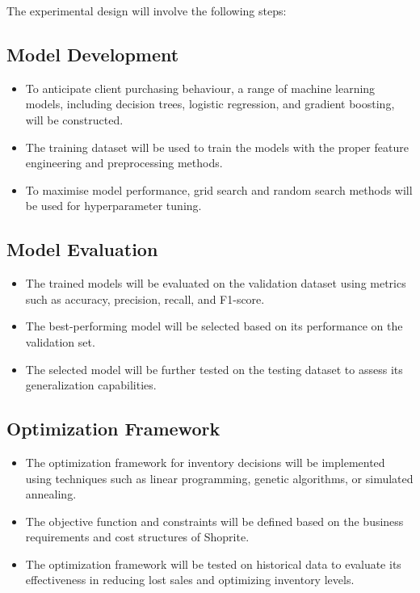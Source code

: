 \documentclass{article}
\begin{document}
The experimental design will involve the following steps:

\subsection{Model Development}
\begin{itemize}
  \item To anticipate client purchasing behaviour, a range of machine learning models, including decision trees, logistic regression, and gradient boosting, will be constructed.
  \item The training dataset will be used to train the models with the proper feature engineering and preprocessing methods.
  \item To maximise model performance, grid search and random search methods will be used for hyperparameter tuning.
\end{itemize}

\subsection{Model Evaluation}
\begin{itemize}
  \item The trained models will be evaluated on the validation dataset using metrics such as accuracy, precision, recall, and F1-score.
  \item The best-performing model will be selected based on its performance on the validation set.
  \item The selected model will be further tested on the testing dataset to assess its generalization capabilities.
\end{itemize}

\subsection{Optimization Framework}
\begin{itemize}
  \item The optimization framework for inventory decisions will be implemented using techniques such as linear programming, genetic algorithms, or simulated annealing.
  \item The objective function and constraints will be defined based on the business requirements and cost structures of Shoprite.
  \item The optimization framework will be tested on historical data to evaluate its effectiveness in reducing lost sales and optimizing inventory levels.
\end{itemize}
\end{document}
